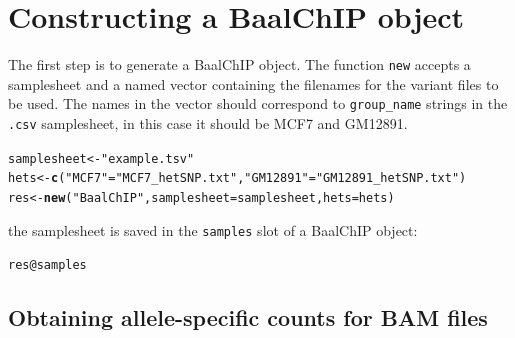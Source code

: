 \documentclass{article}\usepackage[]{graphicx}\usepackage[usenames,dvipsnames]{color}
\makeatletter
\newcommand{\hlstr}[1]{\textcolor[rgb]{0.192,0.494,0.8}{#1}}%
\newcommand{\hlopt}[1]{\textcolor[rgb]{0,0,0}{#1}}%
\newcommand{\hlstd}[1]{\textcolor[rgb]{0.345,0.345,0.345}{#1}}%
\newcommand{\hlkwb}[1]{\textcolor[rgb]{0.69,0.353,0.396}{#1}}%
\newcommand{\hlkwc}[1]{\textcolor[rgb]{0.333,0.667,0.333}{#1}}%
\newcommand{\hlkwd}[1]{\textcolor[rgb]{0.737,0.353,0.396}{\textbf{#1}}}%
\newenvironment{kframe}{%
 \def\at@end@of@kframe{}%
 \ifinner\ifhmode%
  \def\at@end@of@kframe{\end{minipage}}%
  \begin{minipage}{\columnwidth}%
 \fi\fi%
 \def\FrameCommand##1{\hskip\@totalleftmargin \hskip-\fboxsep
 \colorbox{shadecolor}{##1}\hskip-\fboxsep
     \hskip-\linewidth \hskip-\@totalleftmargin \hskip\columnwidth}%
 \MakeFramed {\advance\hsize-\width
   \@totalleftmargin\z@ \linewidth\hsize
   \@setminipage}}%
 {\par\unskip\endMakeFramed%
 \at@end@of@kframe}
\newenvironment{knitrout}{}{} %
\makeatother
\begin{document}

\section{Constructing a BaalChIP object}

The first step is to generate a BaalChIP object. The function \texttt{new} accepts a samplesheet and a named vector containing the filenames for the variant files to be used. The names in the vector should correspond to \texttt{group\_name} strings in the \texttt{.csv} samplesheet, in this case it should be \textquotedbl{}MCF7\textquotedbl{} and \textquotedbl{}GM12891\textquotedbl{}.

\begin{knitrout}
\color{fgcolor}\begin{kframe}
\begin{alltt}
\hlstd{samplesheet} \hlkwb{<-} \hlstr{"example.tsv"}
\hlstd{hets} \hlkwb{<-} \hlkwd{c}\hlstd{(}\hlstr{"MCF7"}\hlstd{=}\hlstr{"MCF7_hetSNP.txt"}\hlstd{,} \hlstr{"GM12891"}\hlstd{=}\hlstr{"GM12891_hetSNP.txt"}\hlstd{)}
\hlstd{res} \hlkwb{<-} \hlkwd{new}\hlstd{(}\hlstr{"BaalChIP"}\hlstd{,} \hlkwc{samplesheet}\hlstd{=samplesheet,} \hlkwc{hets}\hlstd{=hets)}
\end{alltt}
\end{kframe}
\end{knitrout}

the samplesheet is saved in the \texttt{samples} slot of a BaalChIP object:

\begin{knitrout}
\color{fgcolor}\begin{kframe}
\begin{alltt}
\hlstd{res}\hlopt{@}\hlkwc{samples}
\end{alltt}
\end{kframe}
\end{knitrout}

\subsection{Obtaining allele-specific counts for BAM files}
\end{document}
